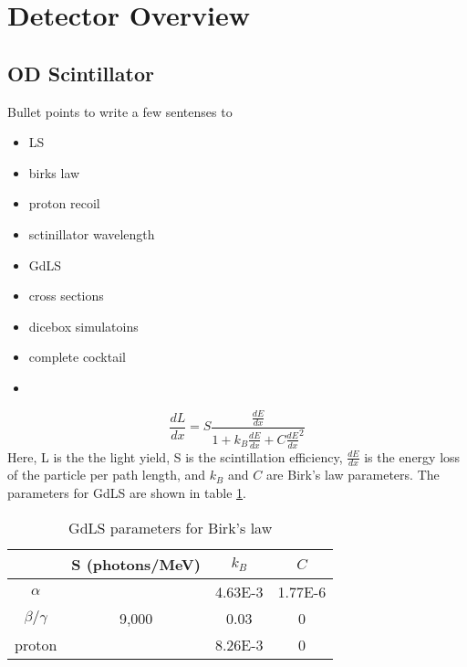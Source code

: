 \section{Detector Overview} \label{OD_detector_overview}


\subsection{OD Scintillator}
Bullet points to write a few sentenses to
\begin{itemize}
    \item LS
    \item birks law
    \item proton recoil
    \item sctinillator wavelength
    \item GdLS
    \item cross sections
    \item dicebox simulatoins
    \item complete cocktail
    \item 
\end{itemize}


\begin{equation}
    \frac{dL}{dx} = S \frac{\frac{dE}{dx}}{1 + k_{B}\frac{dE}{dx} + C\frac{dE}{dx}^2}
    \label{eq:birkslaw}
\end{equation}
Here, L is the the light yield, S is the scintillation efficiency, $\frac{dE}{dx}$ is the energy loss of the particle per path length, and $k_{B}$ and $C$ are Birk's law parameters.
The parameters for GdLS are shown in table \ref{tab:Birks_law_parameters}.





\begin{table}[!htbp]
    \centering
    \begin{tabular}{c | c | c | c }
                   & S (photons/MeV) & $k_{B}$ & $C$ \\ \hline
    $\alpha$       &                 & 4.63E-3 & 1.77E-6 \\
    $\beta/\gamma$ & 9,000           & 0.03    & 0 \\ 
    proton         &                 & 8.26E-3 & 0
    \end{tabular}
    \caption{GdLS parameters for Birk's law}
    \label{tab:Birks_law_parameters}
\end{table} 

